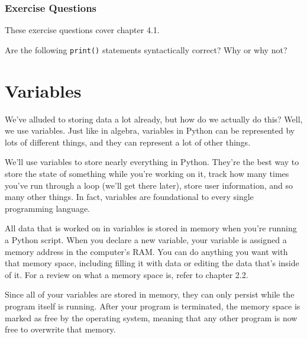 \subsubsection*{Exercise Questions}
These exercise questions cover chapter 4.1.
\begin{Exercise}
\end{Exercise}
\begin{Exercise}
\end{Exercise}
\begin{Exercise}
    Are the following \verb|print()| statements syntactically correct? Why or why not?
\end{Exercise}

\section{Variables}
We've alluded to storing data a lot already, but how do we actually do this? Well, we use variables. Just like in algebra, variables in Python can be represented by lots of different things, and they can represent a lot of other things.\par
We'll use variables to store nearly everything in Python. They're the best way to store the state of something while you're working on it, track how many times you've run through a loop (we'll get there later), store user information, and so many other things. In fact, variables are foundational to every single programming language.\par
All data that is worked on in variables is stored in memory when you're running a Python script. When you declare a new variable, your variable is assigned a memory address in the computer's RAM. You can do anything you want with that memory space, including filling it with data or editing the data that's inside of it. For a review on what a memory space is, refer to chapter 2.2.\par
Since all of your variables are stored in memory, they can only persist while the program itself is running. After your program is terminated, the memory space is marked as free by the operating system, meaning that any other program is now free to overwrite that memory. \par

